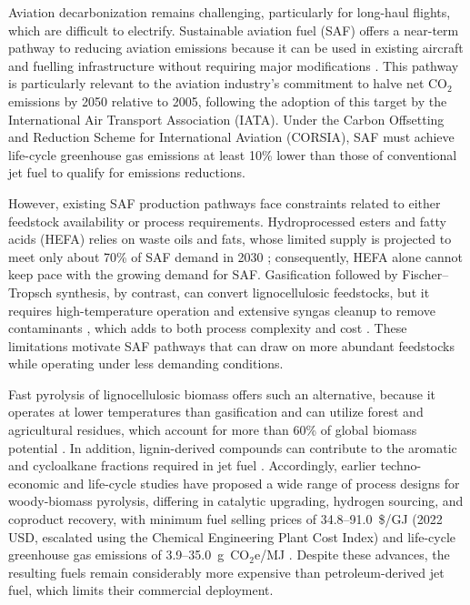 
Aviation decarbonization remains challenging, particularly for long-haul flights, which are difficult to electrify. Sustainable aviation fuel (SAF) offers a near-term pathway to reducing aviation emissions because it can be used in existing aircraft and fuelling infrastructure without requiring major modifications \citep{atsonios2015alternative, doliente2020bio}. This pathway is particularly relevant to the aviation industry's commitment to halve net CO$_2$ emissions by 2050 relative to 2005, following the adoption of this target by the International Air Transport Association (IATA). Under the Carbon Offsetting and Reduction Scheme for International Aviation (CORSIA), SAF must achieve life-cycle greenhouse gas emissions at least 10\% lower than those of conventional jet fuel to qualify for emissions reductions. 

However, existing SAF production pathways face constraints related to either feedstock availability or process requirements. Hydroprocessed esters and fatty acids (HEFA) relies on waste oils and fats, whose limited supply is projected to meet only about 70\% of SAF demand in 2030 \citep{doliente2020bio}; consequently, HEFA alone cannot keep pace with the growing demand for SAF. Gasification followed by Fischer--Tropsch synthesis, by contrast, can convert lignocellulosic feedstocks, but it requires high-temperature operation and extensive syngas cleanup to remove contaminants \citep{jones2013process}, which adds to both process complexity and cost \citep{swanson2010techno, anex2010techno}. These limitations motivate SAF pathways that can draw on more abundant feedstocks while operating under less demanding conditions.

Fast pyrolysis of lignocellulosic biomass offers such an alternative, because it operates at lower temperatures than gasification \citep{bridgwater2012review, swanson2010techno} and can utilize forest and agricultural residues, which account for more than 60\% of global biomass potential \citep{wang2019biomass}. In addition, lignin-derived compounds can contribute to the aromatic and cycloalkane fractions required in jet fuel \citep{son2022hybrid, escalante2022evaluation}.
Accordingly, earlier techno-economic and life-cycle studies have proposed a wide range of process designs for woody-biomass pyrolysis, differing in catalytic upgrading, hydrogen sourcing, and coproduct recovery, with minimum fuel selling prices of 34.8--91.0~\$/GJ (2022 USD, escalated using the Chemical Engineering Plant Cost Index) and life-cycle greenhouse gas emissions of 3.9--35.0~g~CO$_2$e/MJ \citep{dutta2023model, griffin2024opening}. Despite these advances, the resulting fuels remain considerably more expensive than petroleum-derived jet fuel, which limits their commercial deployment.

